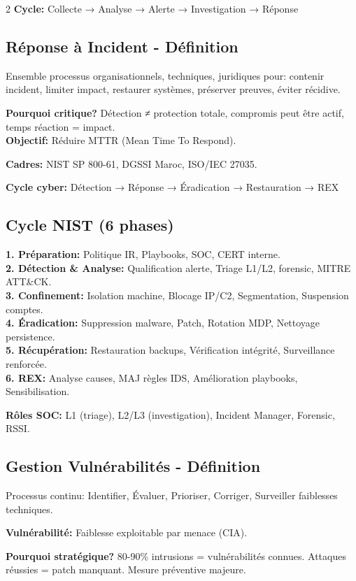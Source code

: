 \documentclass[9pt,a4paper]{extarticle}
\begin{document}
\begin{multicols}{2}
\textbf{Cycle:} Collecte → Analyse → Alerte → Investigation → Réponse

\subsection*{Réponse à Incident - Définition}
Ensemble processus organisationnels, techniques, juridiques pour: contenir incident, limiter impact, restaurer systèmes, préserver preuves, éviter récidive.

\textbf{Pourquoi critique?} Détection ≠ protection totale, compromis peut être actif, temps réaction = impact.\\
\textbf{Objectif:} Réduire MTTR (Mean Time To Respond).

\textbf{Cadres:} NIST SP 800-61, DGSSI Maroc, ISO/IEC 27035.

\textbf{Cycle cyber:} Détection → Réponse → Éradication → Restauration → REX

\subsection*{Cycle NIST (6 phases)}
\textbf{1. Préparation:} Politique IR, Playbooks, SOC, CERT interne.\\
\textbf{2. Détection \& Analyse:} Qualification alerte, Triage L1/L2, forensic, MITRE ATT\&CK.\\
\textbf{3. Confinement:} Isolation machine, Blocage IP/C2, Segmentation, Suspension comptes.\\
\textbf{4. Éradication:} Suppression malware, Patch, Rotation MDP, Nettoyage persistence.\\
\textbf{5. Récupération:} Restauration backups, Vérification intégrité, Surveillance renforcée.\\
\textbf{6. REX:} Analyse causes, MAJ règles IDS, Amélioration playbooks, Sensibilisation.

\textbf{Rôles SOC:} L1 (triage), L2/L3 (investigation), Incident Manager, Forensic, RSSI.

\subsection*{Gestion Vulnérabilités - Définition}
Processus continu: Identifier, Évaluer, Prioriser, Corriger, Surveiller faiblesses techniques.

\textbf{Vulnérabilité:} Faiblesse exploitable par menace (CIA).

\textbf{Pourquoi stratégique?} 80-90\% intrusions = vulnérabilités connues. Attaques réussies = patch manquant. Mesure préventive majeure.


\end{multicols}
\end{document}
